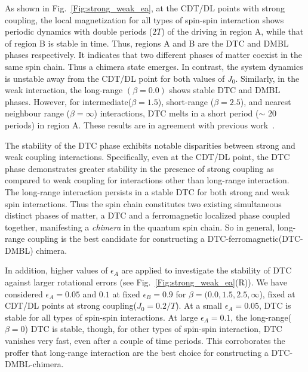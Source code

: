 \documentclass[%
reprint,
superscriptaddress,
amsmath,amssymb,showkeys,
aps,
prb,
]{revtex4-2}
\begin{document}
	
	As shown in Fig.~\ref{Fig:strong_weak_ea}, at the CDT/DL points with strong coupling, the local magnetization for all types of spin-spin interaction shows periodic dynamics with double periods ($2T$) of the driving in region A, while that of region B is stable in time. Thus, regions A and B are the DTC and DMBL phases respectively. It indicates that two different phases of matter coexist in the same spin chain. Thus a chimera state emerges. In contrast, the system dynamics is unstable away from the CDT/DL point for both values of $J_0$. Similarly, in the weak interaction, the long-range $(\beta=0.0)$ shows stable DTC and DMBL phases. However, for intermediate($\beta = 1.5$), short-range ($\beta = 2.5$), and nearest neighbour range ($\beta = \infty$) interactions, DTC melts in a short period ($\sim$ 20 periods) in region A. These results are in agreement with previous work~\cite{sakurai_phys_nodate}.
	
	The stability of the DTC phase exhibits notable disparities between strong and weak coupling interactions. Specifically, even at the CDT/DL point, the DTC phase demonstrates greater stability in the presence of strong coupling as compared to weak coupling for interactions other than long-range interaction. The long-range interaction persists in a stable DTC for both strong and weak spin interactions. Thus the spin chain constitutes two existing simultaneous distinct phases of matter, a DTC and a ferromagnetic localized phase coupled together, manifesting a \textit{chimera} in the quantum spin chain. So in general, long-range coupling is the best candidate for constructing a DTC-ferromagnetic(DTC-DMBL) chimera.
	
	In addition, higher values of $\epsilon_A$ are applied to investigate the stability of DTC against larger rotational errors (see Fig.~\ref{Fig:strong_weak_ea}(R)). We have considered $\epsilon_A = 0.05$  and $0.1$ at fixed $\epsilon_B = 0.9$ for $\beta = (0.0, 1.5, 2.5, \infty$), fixed at CDT/DL points at strong coupling($J_0 = 0.2/T$). At a small $\epsilon_A=0.05$, DTC is stable for all types of spin-spin interactions. At large $\epsilon_A = 0.1$, the long-range($\beta=0$) DTC is stable, though, for other types of spin-spin interaction, DTC vanishes very fast, even after a couple of time periods. This corroborates the proffer that long-range interaction are the best choice for constructing a DTC-DMBL-chimera. 
	
\end{document}
